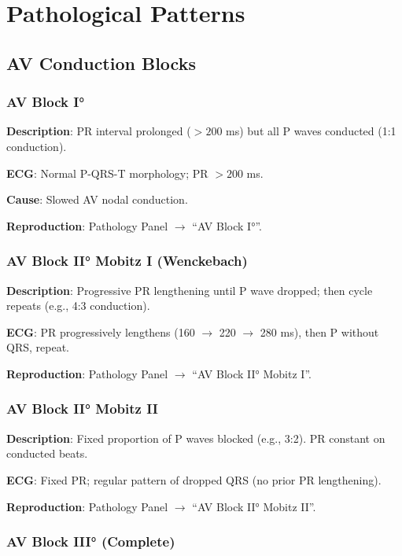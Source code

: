 \documentclass[12pt]{book}
\begin{document}
\chapter{Pathological Patterns}

\section{AV Conduction Blocks}

\subsection{AV Block I°}

\textbf{Description}: PR interval prolonged ($>200$ ms) but all P waves conducted (1:1 conduction).

\textbf{ECG}: Normal P-QRS-T morphology; PR $>200$ ms.

\textbf{Cause}: Slowed AV nodal conduction.

\textbf{Reproduction}: Pathology Panel $\to$ ``AV Block I°''.

\subsection{AV Block II° Mobitz I (Wenckebach)}

\textbf{Description}: Progressive PR lengthening until P wave dropped; then cycle repeats (e.g., 4:3 conduction).

\textbf{ECG}: PR progressively lengthens (160 $\to$ 220 $\to$ 280 ms), then P without QRS, repeat.

\textbf{Reproduction}: Pathology Panel $\to$ ``AV Block II° Mobitz I''.

\subsection{AV Block II° Mobitz II}

\textbf{Description}: Fixed proportion of P waves blocked (e.g., 3:2). PR constant on conducted beats.

\textbf{ECG}: Fixed PR; regular pattern of dropped QRS (no prior PR lengthening).

\textbf{Reproduction}: Pathology Panel $\to$ ``AV Block II° Mobitz II''.

\subsection{AV Block III° (Complete)}
\end{document}
